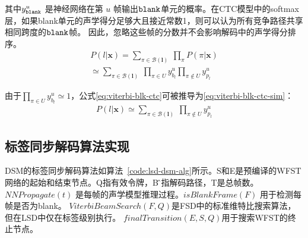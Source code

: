 其中$y^{u}_{\tt{blank}}$ 是神经网络在第 $u$ 帧输出$\tt blank$单元的概率。在CTC模型中的softmax层，如果blank单元的声学得分足够大且接近常数1，则可以认为所有竞争路径共享相同跨度的$\tt blank$帧。 因此，忽略这些帧的分数并不会影响解码中的声学得分排序。
  \begin{equation} \label{eq:viterbi-blk-ctc}
  \begin{split}
      P(l|\mathbf{x})
      =\sum_{\pi\in\mathcal{B}(\mathbf{l})}
          \ \prod_{\pi}P(\pi|\mathbf{x})\\
        \simeq\sum_{\pi\in\mathcal{B}(\mathbf{l})}
         \  \prod_{\pi\in U}{y_{b_l}^u}{\prod_{\pi\not\in U}{y_{p_l}^u}}
        \end{split}
       \end{equation}


由于$\prod_{\pi\in U}{y_{b_l}^u}\simeq 1$，公式\ref{eq:viterbi-blk-ctc}可被推导为\ref{eq:viterbi-blk-ctc-sim}：
  \begin{equation} \label{eq:viterbi-blk-ctc-sim}
  \begin{split}
      P(l|\mathbf{x})
        \simeq\sum_{\pi\in\mathcal{B}(\mathbf{l})}
         \  {\prod_{\pi\not\in U}{y_{p_l}^u}}
        \end{split}
       \end{equation}

\subsection{标签同步解码算法实现}
\label{chap:lsd-lsd-ctc-alg}

DSM的标签同步解码算法如算法~\ref{code:lsd-dsm-alg}所示。S和E是预编译的WFST网络的起始和结束节点。Q指有效令牌，B ̂指解码路径，T是总帧数。$NNPropagate(t)$ 是每帧的声学模型推理过程。$isBlankFrame(F)$ 用于检测每帧是否为blank。 $ViterbiBeamSearch(F, Q)$是FSD中的标准维特比搜索算法，但在LSD中仅在标签级别执行。  $finalTransition(E,S,Q)$用于搜索WFST的终止节点\cite{hori2007efficient}。


